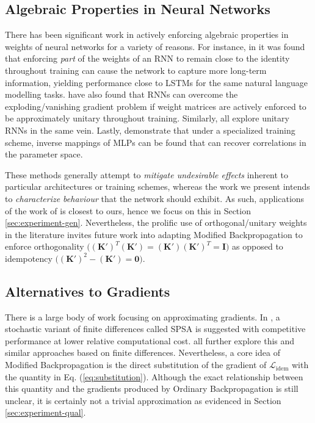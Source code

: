 \documentclass{article}
\theoremstyle{plain}
\theoremstyle{definition}
\theoremstyle{remark}
\newcommand{\vI}{\mathbf{I}}
\newcommand{\vK}{\mathbf{K}}
\begin{document}
\subsection{Algebraic Properties in Neural Networks}
There has been significant work in actively enforcing algebraic properties in weights of neural networks for a variety of reasons. For instance, in \citealt{mikolov-rnn,le-rnn-relu} it was found that enforcing \textit{part} of the weights of an RNN to remain close to the identity throughout training can cause the network to capture more long-term information, yielding performance close to LSTMs for the same natural language modelling tasks. \citealt{arjovsky-rnn} have also found that RNNs can overcome the exploding/vanishing gradient problem if weight matrices are actively enforced to be approximately unitary throughout training. Similarly, \citealt{saxe-isometry,jing-tunable-unn,kiani-projunn} all explore unitary RNNs in the same vein. Lastly, \citealt{ardizzone-inv} demonstrate that under a specialized training scheme, inverse mappings of MLPs can be found that can recover correlations in the parameter space.

These methods generally attempt to \textit{mitigate undesirable effects} inherent to particular architectures or training schemes, whereas the work we present intends to \textit{characterize behaviour} that the network should exhibit. As such, applications of the work of \citealt{shocher-ign} is closest to ours, hence we focus on this in Section \ref{sec:experiment-gen}. Nevertheless, the prolific use of orthogonal/unitary weights in the literature invites future work into adapting Modified Backpropagation to enforce orthogonality ${\big((\vK')^T(\vK')=(\vK')(\vK')^T=\vI\big)}$ as opposed to idempotency ${\big((\vK')^2 - (\vK') = \bm{0}\big)}$.


\subsection{Alternatives to Gradients}
There is a large body of work focusing on approximating gradients. In \citealt{spall-perturb}, a stochastic variant of finite differences called SPSA is suggested with competitive performance at lower relative computational cost. \citealt{bandler-approx,do-approx,scheinberg-approx} all further explore this and similar approaches based on finite differences. Nevertheless, a core idea of Modified Backpropagation is the direct substitution of the gradient of $\mathcal{L}_{\mathrm{idem}}$ with the quantity in Eq. (\ref{eq:substitution}). Although the exact relationship between this quantity and the gradients produced by Ordinary Backpropagation is still unclear, it is certainly not a trivial approximation as evidenced in Section \ref{sec:experiment-qual}.
\end{document}
